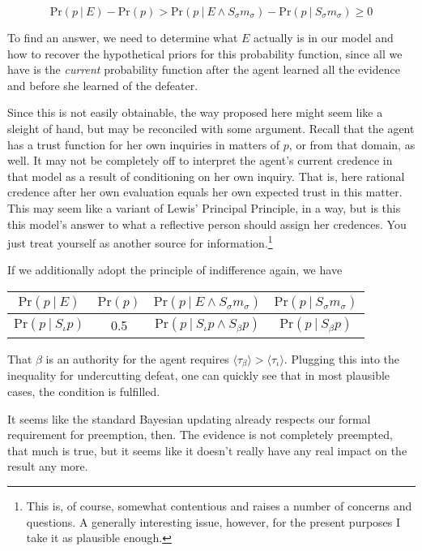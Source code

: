 \documentclass[11pt, a4paper]{scrartcl}
\newcommand{\Ss}{S_{\sigma}}
\newcommand{\given}[1][]{\:#1\vert\:}
\newcommand{\Sm}{\Ss{}m_\sigma}
\renewcommand{\Pr}{\text{Pr}}
\renewcommand{\i}[1]{\emph{#1}}
\begin{document}
\[
    \Pr(p \given E) - \Pr(p) > \Pr(p \given E \land \Sm) - \Pr(p \given \Sm) \geqslant 0
\]

To find an answer, we need to determine what $E$ actually is in our model and how to recover the hypothetical priors for this probability function, since all we have is the \i{current} probability function after the agent learned all the evidence and before she learned of the defeater. 

Since this is not easily obtainable, the way proposed here might seem like a sleight of hand, but may be reconciled with some argument. Recall that the agent has a trust function for her own inquiries in matters of $p$, or from that domain, as well. It may not be completely off to interpret the agent's current credence in that model as a result of conditioning on her own inquiry. That is, here rational credence after her own evaluation equals her own expected trust in this matter. This may seem like a variant of Lewis' Principal Principle, in a way, but is this this model's answer to what a reflective person should assign her credences. You just treat yourself as another source for information.\footnote{This is, of course, somewhat contentious and raises a number of concerns and questions. A generally interesting issue, however, for the present purposes I take it as plausible enough.}   

If we additionally adopt the principle of indifference again, we have

\begin{table}[ht]
\centering
\begin{tabular}{@{}cccc@{}}
\toprule
$\Pr(p \given E)$ & $\Pr(p)$ & $\Pr(p \given E \land \Sm)$ & $\Pr(p \given \Sm)$ \\ \midrule
$\Pr(p \given S_{\iota}p )$ & 0.5 & $\Pr(p \given S_\iota p \land S_\beta p)$ & $\Pr(p \given S_\beta p)$
\end{tabular}
\end{table}

That $\beta$ is an authority for the agent requires $\langle \tau_\beta \rangle > \langle \tau_\iota \rangle$. Plugging this into the inequality for undercutting defeat, one can quickly see that in most plausible cases, the condition is fulfilled.

It seems like the standard Bayesian updating already respects our formal requirement for preemption, then. The evidence is not completely preempted, that much is true, but it seems like it doesn't really have any real impact on the result any more.  
\end{document}

